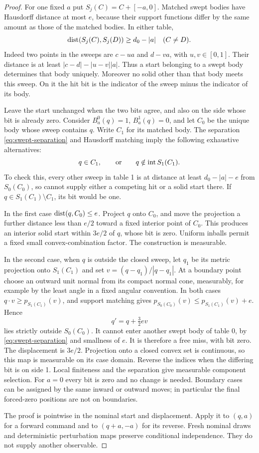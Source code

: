 \begin{proof}
For one fixed $a$ put $S_j(C)=C+[-a,0]$. Matched swept bodies have
Hausdorff distance at most $e$, because their support functions differ
by the same amount as those of the matched bodies. In either table,
\begin{equation}\label{eq:swept-separation}
 \operatorname{dist}(S_j(C),S_j(D))\ge d_0-|a|\quad(C\ne D).
\end{equation}
Indeed two points in the sweeps are $c-ua$ and $d-va$, with
$u,v\in[0,1]$. Their distance is at least $|c-d|-|u-v||a|$.
Thus a start belonging to a swept body determines that body uniquely.
Moreover no solid other than that body meets this sweep. On it the
hit bit is the indicator of the sweep minus the indicator of its body.

Leave the start unchanged when the two bits agree, and also on the
side whose bit is already zero. Consider $B^0_a(q)=1$, $B^1_a(q)=0$,
and let $C_0$ be the unique body whose sweep contains $q$. Write $C_1$
for its matched body. The separation \eqref{eq:swept-separation} and
Hausdorff matching imply the following exhaustive alternatives:
\[
                   q\in C_1,\qquad\hbox{or}\qquad q\notin\operatorname{int}S_1(C_1).
\]
To check this, every other sweep in table 1 is at distance at least
$d_0-|a|-e$ from $S_0(C_0)$, so cannot supply either a competing hit
or a solid start there. If $q\in S_1(C_1)\setminus C_1$, its bit
would be one.

In the first case $\operatorname{dist}(q,C_0)\le e$. Project $q$ onto $C_0$, and
move the projection a further distance less than $e/2$ toward a fixed
interior point of $C_0$. This produces an interior solid start within
$3e/2$ of $q$, whose bit is zero. Uniform inballs permit a fixed small
convex-combination factor. The construction is measurable.

In the second case, when $q$ is outside the closed sweep, let $q_1$
be its metric projection onto $S_1(C_1)$ and set
$v=(q-q_1)/|q-q_1|$. At a boundary point choose an outward unit normal
from its compact normal cone, measurably, for example by the least
angle in a fixed angular convention. In both cases
$q\cdot v\ge p_{S_1(C_1)}(v)$, and support matching gives
$p_{S_0(C_0)}(v)\le p_{S_1(C_1)}(v)+e$. Hence
\[
                       q'=q+\tfrac32 e v
\]
lies strictly outside $S_0(C_0)$. It cannot enter another swept body
of table 0, by \eqref{eq:swept-separation} and smallness of $e$.
It is therefore a free miss, with bit zero. The displacement is $3e/2$.
Projection onto a closed convex set is continuous, so this map is
measurable on its case domain. Reverse the indices when the differing
bit is on side 1. Local finiteness and the separation give measurable
component selection. For $a=0$ every bit is zero and no change is needed.
Boundary cases can be assigned by the same inward or outward moves;
in particular the final forced-zero positions are not on boundaries.

The proof is pointwise in the nominal start and displacement. Apply it
to $(q,a)$ for a forward command and to $(q+a,-a)$ for its reverse.
Fresh nominal draws and deterministic perturbation maps preserve
conditional independence. They do not supply another observable.
\end{proof}

